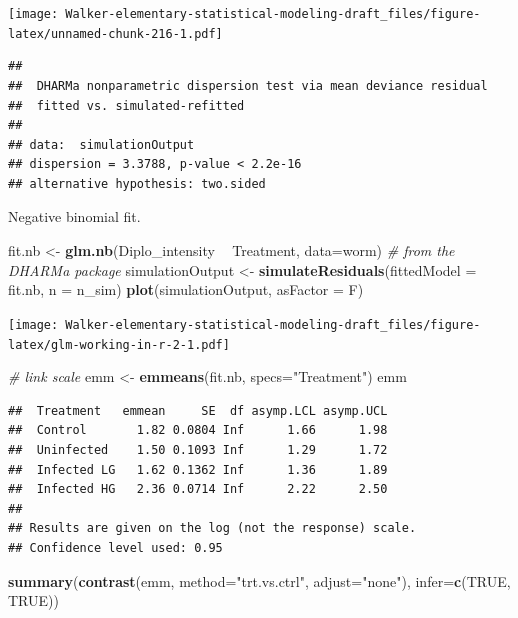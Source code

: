 \documentclass[]{book}
\newenvironment{Shaded}{\begin{snugshade}}{\end{snugshade}}
\newcommand{\CommentTok}[1]{\textcolor[rgb]{0.56,0.35,0.01}{\textit{#1}}}
\newcommand{\DataTypeTok}[1]{\textcolor[rgb]{0.13,0.29,0.53}{#1}}
\newcommand{\KeywordTok}[1]{\textcolor[rgb]{0.13,0.29,0.53}{\textbf{#1}}}
\newcommand{\NormalTok}[1]{#1}
\newcommand{\OperatorTok}[1]{\textcolor[rgb]{0.81,0.36,0.00}{\textbf{#1}}}
\newcommand{\OtherTok}[1]{\textcolor[rgb]{0.56,0.35,0.01}{#1}}
\newcommand{\StringTok}[1]{\textcolor[rgb]{0.31,0.60,0.02}{#1}}
\begin{document}
\texttt{[image: Walker-elementary-statistical-modeling-draft\_files/figure-latex/unnamed-chunk-216-1.pdf]}

\begin{verbatim}
## 
##  DHARMa nonparametric dispersion test via mean deviance residual
##  fitted vs. simulated-refitted
## 
## data:  simulationOutput
## dispersion = 3.3788, p-value < 2.2e-16
## alternative hypothesis: two.sided
\end{verbatim}

Negative binomial fit.

\begin{Shaded}
\begin{Highlighting}[]
\NormalTok{fit.nb <-}\StringTok{ }\KeywordTok{glm.nb}\NormalTok{(Diplo_intensity }\OperatorTok{~}\StringTok{ }\NormalTok{Treatment, }\DataTypeTok{data=}\NormalTok{worm)}
\CommentTok{# from the DHARMa package}
\NormalTok{  simulationOutput <-}\StringTok{ }\KeywordTok{simulateResiduals}\NormalTok{(}\DataTypeTok{fittedModel =}\NormalTok{ fit.nb, }\DataTypeTok{n =}\NormalTok{ n_sim)}
  \KeywordTok{plot}\NormalTok{(simulationOutput, }\DataTypeTok{asFactor =}\NormalTok{ F)}
\end{Highlighting}
\end{Shaded}

\texttt{[image: Walker-elementary-statistical-modeling-draft\_files/figure-latex/glm-working-in-r-2-1.pdf]}

\begin{Shaded}
\begin{Highlighting}[]
\CommentTok{# link scale}
\NormalTok{emm <-}\StringTok{ }\KeywordTok{emmeans}\NormalTok{(fit.nb, }\DataTypeTok{specs=}\StringTok{"Treatment"}\NormalTok{)}
\NormalTok{emm}
\end{Highlighting}
\end{Shaded}

\begin{verbatim}
##  Treatment   emmean     SE  df asymp.LCL asymp.UCL
##  Control       1.82 0.0804 Inf      1.66      1.98
##  Uninfected    1.50 0.1093 Inf      1.29      1.72
##  Infected LG   1.62 0.1362 Inf      1.36      1.89
##  Infected HG   2.36 0.0714 Inf      2.22      2.50
## 
## Results are given on the log (not the response) scale. 
## Confidence level used: 0.95
\end{verbatim}

\begin{Shaded}
\begin{Highlighting}[]
\KeywordTok{summary}\NormalTok{(}\KeywordTok{contrast}\NormalTok{(emm, }\DataTypeTok{method=}\StringTok{"trt.vs.ctrl"}\NormalTok{, }\DataTypeTok{adjust=}\StringTok{"none"}\NormalTok{), }\DataTypeTok{infer=}\KeywordTok{c}\NormalTok{(}\OtherTok{TRUE}\NormalTok{, }\OtherTok{TRUE}\NormalTok{))}
\end{Highlighting}
\end{Shaded}
\end{document}
